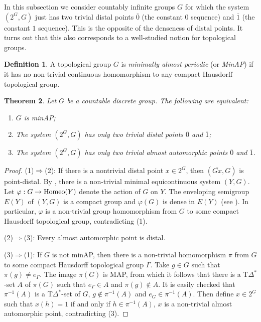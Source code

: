 \documentclass[11pt]{amsart}
\newtheorem{theorem}{Theorem}[section]
\theoremstyle{definition}
\newtheorem{definition}[theorem]{Definition}
\numberwithin{equation}{section}
\theoremstyle{definition}
\begin{document}
In this subsection we consider countably infinite groups $G$ for which the system $(2^G,G)$ just has two trivial distal points $\overline{0}$ (the constant $0$ sequence) and $\overline{1}$ (the constant $1$ sequence). This is the opposite of the denseness of distal points. It turns out that this also corresponds to a well-studied notion for topological groups. 

\begin{definition} A topological group $G$ is {\em minimally almost periodic} (or {\em MinAP}) if it has no non-trivial continuous homomorphism to any compact Hausdorff topological group.
\end{definition}

\begin{theorem} 
Let $G$ be  a countable discrete group. The following are equivalent:
\begin{enumerate}
\item $G$ is minAP;
\item The system $(2^G,G)$ has only two trivial distal points $\overline{0}$ and $\overline{1}$;
\item The system $(2^G,G)$ has only two trivial almost automorphic points $\overline{0}$ and $\overline{1}$.
\end{enumerate}
\end{theorem}
\begin{proof}
(1)$\Rightarrow$(2): If there is a nontrivial distal point $x\in 2^G$, then $(\overline{Gx},G)$ is point-distal. By \cite[Theorem 6.1]{Veech2}, there is a non-trivial minimal equicontinuous system $(Y,G)$. Let $\varphi:G\to{\rm Homeo}(Y)$ denote the action of $G$ on $Y$. The enveloping semigroup $E(Y)$ of $(Y,G)$ is a compact group and $\varphi(G)$ is dense in $E(Y)$ (see \cite[Chapter 3, Theorem 3]{AusBook}). In particular, $\varphi$ is a non-trivial group homomorphism from $G$ to some compact Hausdorff topological group, contradicting (1).

(2)$\Rightarrow$(3): Every almost automorphic point is distal.

(3)$\Rightarrow$(1): If $G$ is not minAP, then there is a non-trivial homomorphism $\pi$ from $G$ to some compact Hausdorff topological group $\Gamma$. Take $g\in G$ such that $\pi(g)\ne e_\Gamma$. The image $\pi(G)$ is MAP, from which it follows that there is a T$\Delta^*$-set $A$ of $\pi(G)$ such that $e_\Gamma\in A$ and $\pi(g)\notin A$. It is easily checked that $\pi^{-1}(A)$ is a T$\Delta^*$-set of $G$, $g\notin \pi^{-1}(A)$ and $e_G\in \pi^{-1}(A)$. Then define $x\in 2^G$ such that $x(h)=1$ if and only if $h\in \pi^{-1}(A)$, $x$ is a non-trivial almost automorphic point, contradicting (3).
\end{proof}
\end{document}
